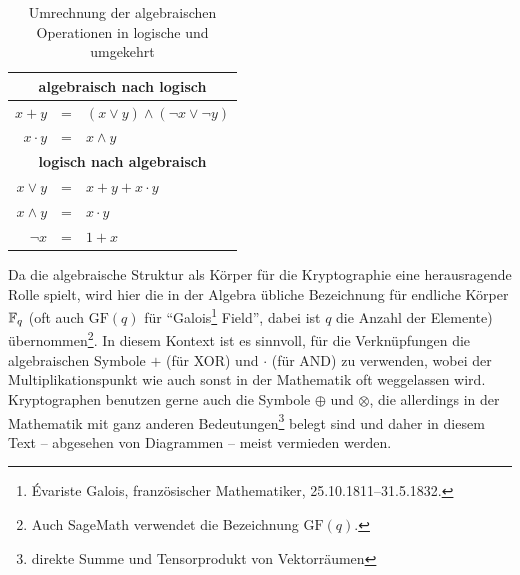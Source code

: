 \begin{refsegment}
\begin{table}[h]
\begin{center}
\begin{tabular}{|rcl|} \hline
   \multicolumn{3}{|c|}{\textbf{algebraisch nach logisch}}          \\ \hline
   $x + y$      & = & $(x \vee y) \wedge (\neg x \vee \neg y)$ \\
   $x \cdot y$  & = & $x \wedge y$                             \\ \hline \hline
   \multicolumn{3}{|c|}{\textbf{logisch nach algebraisch}}          \\ \hline
   $x \vee y$   & = & $x + y + x\cdot y$                       \\
   $x \wedge y$ & = & $x \cdot y$                              \\
   $\neg x$     & = & $1 + x$                                  \\ \hline
\end{tabular}
\end{center}
\caption{Umrechnung der algebraischen Operationen in logische und umgekehrt}\label{t-bool-trf}
\end{table}

Da die algebraische Struktur als Körper für die Kryptographie
eine herausragende Rolle spielt, wird hier die in der Algebra übliche
Bezeichnung für endliche Körper $\mathbb{F}_q$ (oft
auch $\text{GF}(q)$ für "`Galois\footnote{%
  Évariste Galois, französischer Mathematiker,
  25.10.1811--31.5.1832.
}
Field"', dabei ist $q$ die Anzahl der Elemente) übernommen\footnote{%
  Auch SageMath verwendet die Bezeichnung $\text{GF}(q)$.
}.
In diesem Kontext ist es sinnvoll, für die
Verknüpfungen die algebraischen Symbole $+$ (für XOR) und
$\cdot$ (für AND) zu verwenden, wobei der Multiplikationspunkt wie
auch sonst in der Mathematik oft weggelassen wird. Kryptographen benutzen
gerne auch die Symbole $\oplus$ und $\otimes$, die allerdings in der
Mathematik mit ganz anderen Bedeutungen\footnote{%
  direkte Summe und Tensorprodukt von Vektorräumen
}
belegt sind und daher in diesem Text -- abgesehen von Diagrammen --
meist vermieden werden.


\end{refsegment}
